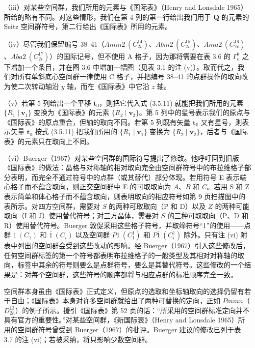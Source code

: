 \noindent（iii）对某些空间群，我们所用的元素与《国际表》（Henry and Lonsdale 1965）所给的略有不同。对这些情形，我们在第 4 列的第一行给出我们用于 $\mathbf{Q}$ 的元素的 Seitz 空间群符号，第二行给出《国际表》所用的元素。

\noindent（iv）尽管我们保留编号 38--41（$Amm2\ (C_{2v}^{14})$、$Abm2\ (C_{2v}^{15})$、$Ama2\ (C_{2v}^{16})$、$Aba2\ (C_{2v}^{17})$）的国际记号，但不使用 A 格子，因为那将需要在表 3.6 的 $\Gamma_{o}^{b}$ 之下增加一个条目，并在图 3.6 中增加一幅图（见表 3.1 的注 (v)）。取而代之，我们对所有单斜底心空间群一律使用 C 格子，并把编号 38--41 的点群操作的取向改为使二次转动轴沿 $y$ 轴，而在《国际表》中它沿 $z$ 轴。

\noindent（v）若第 5 列给出一个平移 $\mathbf{t}_{0}$，则把它代入式 (3.5.11) 就能把我们所用的元素 $\{R_{1} \mid \mathbf{v}_{1}\}$ 变换为《国际表》的元素 $\{R_{2} \mid \mathbf{v}_{2}\}$。第 5 列中的星号表示我们的原点与《国际表》的原点重合，但轴的取向不同。若第 5 列既有矢量 $\mathbf{t}_{0}$ 又有星号，则表示矢量 $\mathbf{t}_{0}$ 按式 (3.5.11) 把我们所用的 $\{R_{1} \mid \mathbf{v}_{1}\}$ 变换为 $\{R_{2} \mid \mathbf{v}_{2}\}$，后者与《国际表》的元素只在取向上不同。

\noindent（vi）Buerger（1967）对某些空间群的国际符号提出了修改。他呼吁回到旧版《国际表》的做法：晶格与对称轴的相对取向完全由空间群符号中的布拉维格子部分表明，而完全不通过符号中的点群（或其替代）部分体现。若用符号 E 表示端心格子而不蕴含取向，则正交空间群中 E 的可取取向为 $A$、$B$ 和 $C$。若用 S 和 Z 表示简单和体心格子而不蕴含取向，则表明取向的相应符号如第 9 页扫描图中的表所示。对四方空间群，需要对 $S$ 的两种可取取向（P 和 D）以及 $Z$ 的两种可能取向（I 和 J）使用替代符号；对三方晶体，需要对 $S$ 的三种可取取向（P、D 和 R）使用替代符号。Buerger 敦促采用这些格子符号，并取缔符号“1”的使用——点群 $1\ (C_{1})$ 和 $\bar{1}\ (C_{i})$ 以及空间群 $P1\ (C_{1}^{1})$ 和 $P\bar{1}\ (C_{i}^{1})$ 除外。只有注 (vi) 附表中列出的空间群会受到这些改动的影响。经 Buerger（1967）引入这些修改后，任何空间群标签的第一个符号都表明布拉维格子的一般类型及其相对对称轴的取向，标签中其余的符号则要么是点群符号，要么是其替代符号。这些修改的一个结果是：对每个空间群，这些符号的顺序都将与相应点群的标准顺序完全一致。

空间群本身虽由《国际表》正式定义，但原点的选取和坐标轴取向的选择仍留有若干自由；《国际表》本身对许多空间群就给出了两种可替换的定向，正如 $Pmmn$（$D_{2h}^{13}$）的例子所示。援引《国际表》第 52 页的话：“所采用的空间群标准定向并不具有官方的重要性。”对某些空间群，《新国际表》（Henry and Lonsdale 1965）所用的空间群符号曾受到 Buerger（1967）的批评。Buerger 建议的修改已列于表 3.7 的注 (vi)；若被采纳，将只影响少数空间群。

